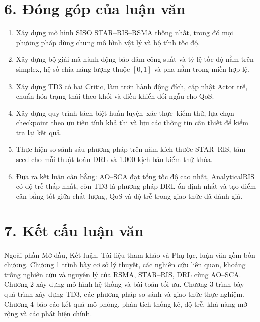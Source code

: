 \section*{6. Đóng góp của luận văn}
\begin{enumerate}[label=\arabic*)]
  \item Xây dựng mô hình SISO STAR--RIS--RSMA thống nhất, trong đó mọi phương pháp dùng chung mô hình vật lý và bộ tính tốc độ.
  \item Xây dựng bộ giải mã hành động bảo đảm công suất và tỷ lệ tốc độ nằm trên simplex, hệ số chia năng lượng thuộc $[0,1]$ và pha nằm trong miền hợp lệ.
  \item Xây dựng TD3 có hai Critic, làm trơn hành động đích, cập nhật Actor trễ, chuẩn hóa trạng thái theo khối và điều khiển đối ngẫu cho QoS.
  \item Xây dựng quy trình tách biệt huấn luyện--xác thực--kiểm thử, lựa chọn checkpoint theo ưu tiên tính khả thi và lưu các thông tin cần thiết để kiểm tra lại kết quả.
  \item Thực hiện so sánh sáu phương pháp trên năm kích thước STAR--RIS, tám seed cho mỗi thuật toán DRL và 1.000 kịch bản kiểm thử khóa.
  \item Đưa ra kết luận cân bằng: AO--SCA đạt tổng tốc độ cao nhất, AnalyticalRIS có độ trễ thấp nhất, còn TD3 là phương pháp DRL ổn định nhất và tạo điểm cân bằng tốt giữa chất lượng, QoS và độ trễ trong giao thức đã đánh giá.
\end{enumerate}

\section*{7. Kết cấu luận văn}
Ngoài phần Mở đầu, Kết luận, Tài liệu tham khảo và Phụ lục, luận văn gồm bốn chương. Chương 1 trình bày cơ sở lý thuyết, các nghiên cứu liên quan, khoảng trống nghiên cứu và nguyên lý của RSMA, STAR--RIS, DRL cùng AO--SCA. Chương 2 xây dựng mô hình hệ thống và bài toán tối ưu. Chương 3 trình bày quá trình xây dựng TD3, các phương pháp so sánh và giao thức thực nghiệm. Chương 4 báo cáo kết quả mô phỏng, phân tích thống kê, độ trễ, khả năng mở rộng và các phát hiện chính.
